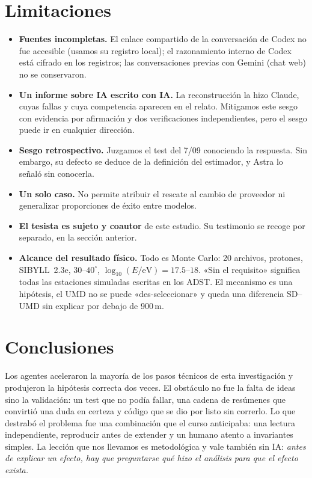 \documentclass[11pt,a4paper]{article}
\begin{document}
\section{Limitaciones}
\begin{itemize}
  \item \textbf{Fuentes incompletas.} El enlace compartido de la conversación de Codex no fue accesible
  (usamos su registro local); el razonamiento interno de Codex está cifrado en los registros; las
  conversaciones previas con Gemini (chat web) no se conservaron.
  \item \textbf{Un informe sobre IA escrito con IA.} La reconstrucción la hizo Claude, cuyas fallas y cuya
  competencia aparecen en el relato. Mitigamos este sesgo con evidencia por afirmación y dos verificaciones
  independientes, pero el sesgo puede ir en cualquier dirección.
  \item \textbf{Sesgo retrospectivo.} Juzgamos el test del 7/09 conociendo la respuesta. Sin embargo, su
  defecto se deduce de la definición del estimador, y Astra lo señaló sin conocerla.
  \item \textbf{Un solo caso.} No permite atribuir el rescate al cambio de proveedor ni generalizar
  proporciones de éxito entre modelos.
  \item \textbf{El tesista es sujeto y coautor} de este estudio. Su testimonio se recoge por separado, en la
  sección anterior.
  \item \textbf{Alcance del resultado físico.} Todo es Monte Carlo: 20 archivos, protones, SIBYLL~2.3e,
  $30$--$40^\circ$, $\log_{10}(E/\mathrm{eV})=17.5$--$18$. «Sin el requisito» significa todas las estaciones
  simuladas escritas en los ADST. El mecanismo es una hipótesis, el UMD no se puede «des-seleccionar» y queda
  una diferencia SD--UMD sin explicar por debajo de 900\,m.
\end{itemize}

\section{Conclusiones}
Los agentes aceleraron la mayoría de los pasos técnicos de esta investigación y produjeron la hipótesis
correcta dos veces. El obstáculo no fue la falta de ideas sino la validación: un test que no podía fallar,
una cadena de resúmenes que convirtió una duda en certeza y código que se dio por listo sin correrlo. Lo que
destrabó el problema fue una combinación que el curso anticipaba: una lectura independiente, reproducir antes
de extender y un humano atento a invariantes simples. La lección que nos llevamos es metodológica y vale
también sin IA: \emph{antes de explicar un efecto, hay que preguntarse qué hizo el análisis para que el efecto
exista.}
\end{document}
